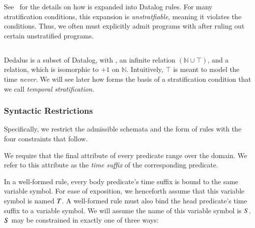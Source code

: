 See~\cite{greedychoice} for the details on how  is expanded into Datalog rules.  For many stratification conditions, this expansion is {\em unstratfiable}, meaning it violates the conditions.  Thus, we often must explicitly admit programs with  after ruling out certain unstratified programs.

\subsection{\lang}
Dedalus is a subset of Datalog, with , an infinite  relation $(\mathbb{N} \cup \top)$, and a  relation, which is isomorphic to $+1$ on $\mathbb{N}$.  Intuitively, $\top$ is meant to model the time {\em never}.  We will see later how  forms the basis of a stratification condition that we call {\em temporal stratification}.

\subsubsection{Syntactic Restrictions}
\label{sec:syntaxrestrictions}

Specifically, we restrict the admissible schemata and the form of rules with the four constraints that follow.

We require that the final attribute of every \lang predicate range over the  domain.  
We refer to this attribute as the \emph{time suffix} of the corresponding predicate.

%
%
In a well-formed \lang rule, every body predicate's time suffix is bound to the
same variable symbol.  For ease of exposition, we henceforth assume that this
variable symbol is named $\DT$.  A well-formed \lang rule must also bind the head
predicate's time suffix to a variable symbol.  We will assume the name of this
variable symbol is $\DS$.  $\DS$ may be constrained in exactly one of three ways:


